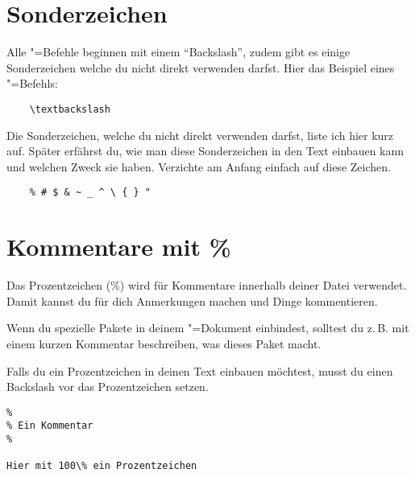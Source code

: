 
\section{Sonderzeichen}
\label{Sonderzeichen}

Alle \DMLLaTeX"=Befehle beginnen mit einem \enquote{Backslash}, zudem gibt es einige Sonderzeichen welche du nicht direkt verwenden darfst. Hier das Beispiel eines \DMLLaTeX"=Befehls:
\begin{lstlisting}
	\textbackslash
\end{lstlisting}

Die Sonderzeichen, welche du nicht direkt verwenden darfst, liste ich hier kurz auf. Später erfährst du, wie man diese Sonderzeichen in den Text einbauen kann und welchen Zweck sie haben. Verzichte am Anfang einfach auf diese Zeichen.
\begin{lstlisting}
	% # $ & ~ _ ^ \ { } "
\end{lstlisting}

\section{Kommentare mit \%}

Das Prozentzeichen (\%) wird für Kommentare innerhalb deiner Datei verwendet. Damit kannst du für dich Anmerkungen machen und Dinge kommentieren. 

Wenn du spezielle Pakete in deinem \DMLLaTeX"=Dokument einbindest, solltest du z.\,B. mit einem kurzen Kommentar beschreiben, was dieses Paket macht.

Falls du ein Prozentzeichen in deinen Text einbauen möchtest, musst du einen Backslash vor das Prozentzeichen setzen.
\begin{lstlisting}
%
% Ein Kommentar
%

Hier mit 100\% ein Prozentzeichen
\end{lstlisting}



